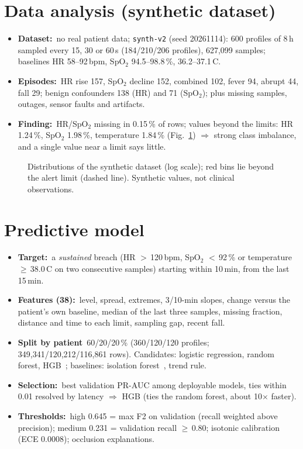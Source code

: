 \documentclass[10pt,a4paper]{article}
\newcommand{\lead}[1]{\textbf{#1}\,}
\begin{document}
\section{Data analysis (synthetic dataset)}
\begin{itemize}
\item \lead{Dataset:} no real patient data; \texttt{synth-v2} (seed 20261114): 600 profiles of 8\,h sampled every 15, 30 or 60\,s (184/210/206 profiles), 627{,}099 samples; baselines HR 58--92\,bpm, SpO$_2$ 94.5--98.8\,\%, 36.2--37.1\,\textdegree C.
\item \lead{Episodes:} HR rise 157, SpO$_2$ decline 152, combined 102, fever 94, abrupt 44, fall 29; benign confounders 138 (HR) and 71 (SpO$_2$); plus missing samples, outages, sensor faults and artifacts.
\item \lead{Finding:} HR/SpO$_2$ missing in 0.15\,\% of rows; values beyond the limits: HR 1.24\,\%, SpO$_2$ 1.98\,\%, temperature 1.84\,\% (Fig.~\ref{fig:hist}) $\Rightarrow$ strong class imbalance, and a single value near a limit says little.
\end{itemize}
\begin{figure}[!htb]
\centering

\caption{Distributions of the synthetic dataset (log scale); red bins lie beyond the alert limit (dashed line). Synthetic values, not clinical observations.}
\label{fig:hist}
\end{figure}

\section{Predictive model}\label{sec:ml}
\begin{itemize}
\item \lead{Target:} a \emph{sustained} breach (HR $>$\,120\,bpm, SpO$_2$ $<$\,92\,\% or temperature $\geq$\,38.0\,\textdegree C on two consecutive samples) starting within 10\,min, from the last 15\,min.
\item \lead{Features (38):} level, spread, extremes, 3/10-min slopes, change versus the patient's own baseline, median of the last three samples, missing fraction, distance and time to each limit, sampling gap, recent fall.
\item \lead{Split by patient} 60/20/20\,\% (360/120/120 profiles; 349{,}341/120{,}212/116{,}861 rows). Candidates: logistic regression, random forest, HGB~\cite{pedregosa2011sklearn,ke2017lightgbm}; baselines: isolation forest~\cite{liu2008iforest}, trend rule.
\item \lead{Selection:} best validation PR-AUC among deployable models, ties within 0.01 resolved by latency $\Rightarrow$ HGB (ties the random forest, about 10$\times$ faster).
\item \lead{Thresholds:} high 0.645 = max F2 on validation (recall weighted above precision); medium 0.231 = validation recall $\geq$\,0.80; isotonic calibration~\cite{zadrozny2002calibration} (ECE 0.0008); occlusion explanations.
\end{itemize}
\end{document}
